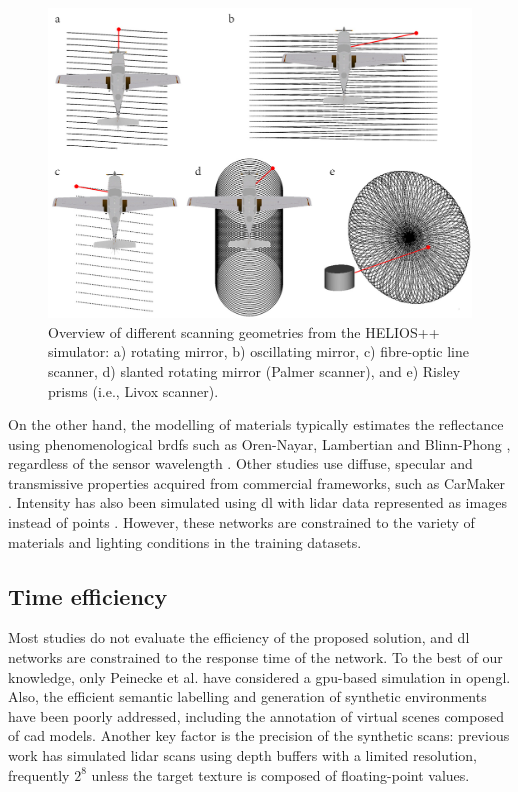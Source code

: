 \begin{figure}[ht]
	\includegraphics[width=\linewidth]{figs/context/scan_geometries_lidar.png}
	\caption{Overview of different scanning geometries from the HELIOS++ simulator: a) rotating mirror, b) oscillating mirror, c) fibre-optic line scanner, d) slanted rotating mirror (Palmer scanner), and e) Risley prisms (i.e., Livox scanner). }
    \label{fig:scan_geometries_lidar}
\end{figure}

On the other hand, the modelling of materials typically estimates the reflectance using phenomenological \acrshort{brdf}s such as Oren-Nayar, Lambertian and Blinn-Phong \cite{chen_analysis_2022}, regardless of the sensor wavelength \cite{chen_analysis_2022, gschwandtner_blensor_2011, zohdi_rapid_2020}. Other studies use diffuse, specular and transmissive properties acquired from commercial frameworks, such as CarMaker \cite{haider_development_2022}. Intensity has also been simulated using \acrshort{dl} with \acrshort{lidar} data represented as images instead of points \cite{vacek_learning_2022, xiao_synlidar_2021}. However, these networks are constrained to the variety of materials and lighting conditions in the training datasets. 

\subsection{Time efficiency}

Most studies do not evaluate the efficiency of the proposed solution, and \acrshort{dl} networks are constrained to the response time of the network. To the best of our knowledge, only Peinecke et al. \cite{peinecke_lidar_2008} have considered a \acrshort{gpu}-based simulation in \acrshort{opengl}. Also, the efficient semantic labelling and generation of synthetic environments have been poorly addressed, including the annotation of virtual scenes composed of \acrshort{cad} models. Another key factor is the precision of the synthetic scans: previous work has simulated \acrshort{lidar} scans using depth buffers \cite{su_simulation_2019, fang_augmented_2020, manivasagam_lidarsim_2020} with a limited resolution, frequently $2^8$ unless the target texture is composed of floating-point values. 

